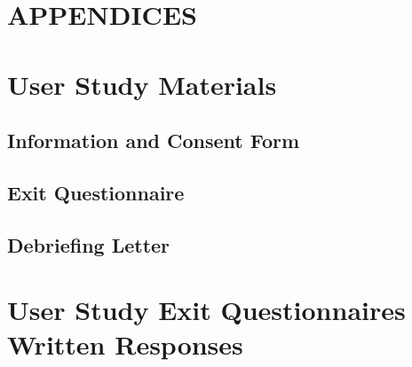 \documentclass[letterpaper,12pt,titlepage,oneside,final]{book} %
\let\origdoublepage\cleardoublepage
\newcommand{\clearemptydoublepage}{%
	\clearpage{\pagestyle{empty}\origdoublepage}}
\let\cleardoublepage\clearemptydoublepage
\begin{document}
	
	 

	\newpage\cleardoublepage
	\newpage\cleardoublepage
	\newpage\cleardoublepage
	\newpage\cleardoublepage
	\newpage\cleardoublepage
	\newpage\cleardoublepage

	\appendix
	\chapter*{APPENDICES}
	
	\chapter[User Study Materials]{User Study Materials}\label{Append:User Study Materials}
	\section{Information and Consent Form}\label{Append:User Study Materials info-form}
	
	\section{Exit Questionnaire}\label{Append:User Study Materials exit-survey}
	
	\section{Debriefing Letter}\label{Append:User Study Materials debriefing}
	
	
	\chapter[User Study Exit Questionnaires Written Responses]{User Study Exit Questionnaires Written Responses}\label{Append:User Study Written Responses}
	
	
\end{document}
